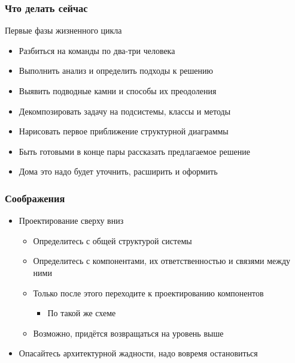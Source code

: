 \documentclass{../mcsslides}
\begin{document}
    \begin{frame}
        \frametitle{Что делать сейчас}
        Первые фазы жизненного цикла
        \begin{itemize}
            \item Разбиться на команды по два-три человека
            \item Выполнить анализ и определить подходы к решению
            \item Выявить подводные камни и способы их преодоления
            \item Декомпозировать задачу на подсистемы, классы и методы
            \item Нарисовать первое приближение структурной диаграммы
            \item Быть готовыми в конце пары рассказать предлагаемое решение
            \item Дома это надо будет уточнить, расширить и оформить
        \end{itemize}
    \end{frame}

    \begin{frame}
        \frametitle{Соображения}
        \begin{itemize}
            \item Проектирование сверху вниз
            \begin{itemize}
                \item Определитесь с общей структурой системы
                \item Определитесь с компонентами, их ответственностью и связями между ними
                \item Только после этого переходите к проектированию компонентов
                \begin{itemize}
                    \item По такой же схеме
                \end{itemize}
                \item Возможно, придётся возвращаться на уровень выше
            \end{itemize}
            \item Опасайтесь архитектурной жадности, надо вовремя остановиться
        \end{itemize}
    \end{frame}
\end{document}
